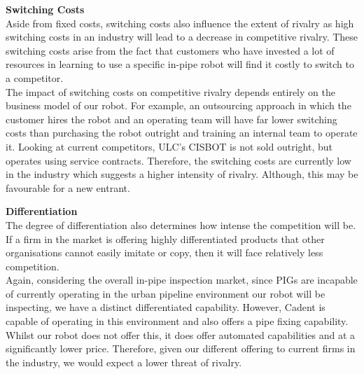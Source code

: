 \documentclass[11pt]{article}		%
\begin{document}
		        \textbf{Switching Costs}\\
		        Aside from fixed costs, switching costs also influence the extent of rivalry as high switching costs in an industry will lead to a decrease in competitive rivalry. These switching costs arise from the fact that customers who have invested a lot of resources in learning to use a specific in-pipe robot will find it costly to switch to a competitor. \\
		        \hspace*{3ex}The impact of switching costs on competitive rivalry depends entirely on the business model of our robot. For example, an outsourcing approach in which the customer hires the robot and an operating team will have far lower switching costs than purchasing the robot outright and training an internal team to operate it. Looking at current competitors, ULC’s CISBOT is not sold outright, but operates using service contracts. Therefore, the switching costs are currently low in the industry which suggests a higher intensity of rivalry. Although, this may be favourable for a new entrant. 
		
		        \textbf{Differentiation}\\
		        The degree of differentiation also determines how intense the competition will be. If a firm in the market is offering highly differentiated products that other organisations cannot easily imitate or copy, then it will face relatively less competition.\\
		        \hspace*{3ex}Again, considering the overall in-pipe inspection market, since PIGs are incapable of currently operating in the urban pipeline environment our robot will be inspecting, we have a distinct differentiated capability. However, Cadent is capable of operating in this environment and also offers a pipe fixing capability. Whilst our robot does not offer this, it does offer automated capabilities and at a significantly lower price. Therefore, given our different offering to current firms in the industry, we would expect a lower threat of rivalry. 
		        
\end{document}
